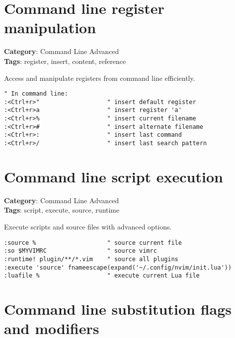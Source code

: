 {{{{\section{Command line register manipulation}

\textbf{Category}: Command Line Advanced\\ \textbf{Tags}: register, insert, content, reference
\vspace{0.5cm}

Access and manipulate registers from command line efficiently.

\begin{Exa*}{}
\begin{Verbatim}[fontsize=\footnotesize, breaklines, breakanywhere]
" In command line:
:<Ctrl+r>"                   " insert default register
:<Ctrl+r>a                   " insert register 'a'
:<Ctrl+r>%                   " insert current filename
:<Ctrl+r>#                   " insert alternate filename
:<Ctrl+r>:                   " insert last command
:<Ctrl+r>/                   " insert last search pattern
\end{Verbatim}
\end{Exa*}

\section{Command line script execution}

\textbf{Category}: Command Line Advanced\\ \textbf{Tags}: script, execute, source, runtime
\vspace{0.5cm}

Execute scripts and source files with advanced options.

\begin{Exa*}{}
\begin{Verbatim}[fontsize=\footnotesize, breaklines, breakanywhere]
:source %                    " source current file
:so $MYVIMRC                 " source vimrc
:runtime! plugin/**/*.vim    " source all plugins
:execute 'source' fnameescape(expand('~/.config/nvim/init.lua'))
:luafile %                   " execute current Lua file
\end{Verbatim}
\end{Exa*}

\section{Command line substitution flags and modifiers}

}}}}
